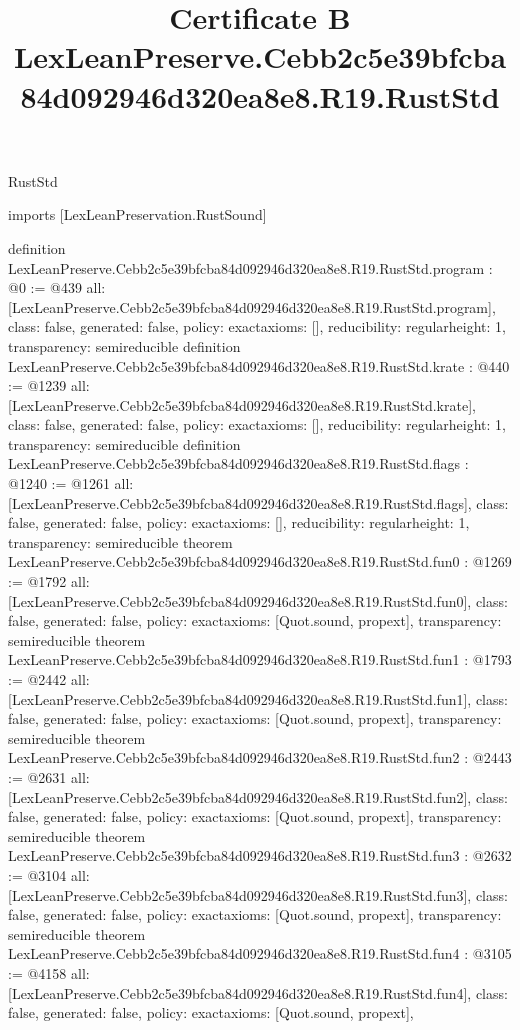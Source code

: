 \begin{lexlean}{RustStd}
\title{Certificate B LexLeanPreserve.Cebb2c5e39bfcba84d092946d320ea8e8.R19.RustStd}
\begin{coremodule}
imports [LexLeanPreservation.RustSound]

definition LexLeanPreserve.Cebb2c5e39bfcba84d092946d320ea8e8.R19.RustStd.program : @0 := @439 {
  all: [LexLeanPreserve.Cebb2c5e39bfcba84d092946d320ea8e8.R19.RustStd.program],
  class: false,
  generated: false,
  policy: exact{axioms: []},
  reducibility: regular{height: 1},
  transparency: semireducible
}
definition LexLeanPreserve.Cebb2c5e39bfcba84d092946d320ea8e8.R19.RustStd.krate : @440 := @1239 {
  all: [LexLeanPreserve.Cebb2c5e39bfcba84d092946d320ea8e8.R19.RustStd.krate],
  class: false,
  generated: false,
  policy: exact{axioms: []},
  reducibility: regular{height: 1},
  transparency: semireducible
}
definition LexLeanPreserve.Cebb2c5e39bfcba84d092946d320ea8e8.R19.RustStd.flags : @1240 := @1261 {
  all: [LexLeanPreserve.Cebb2c5e39bfcba84d092946d320ea8e8.R19.RustStd.flags],
  class: false,
  generated: false,
  policy: exact{axioms: []},
  reducibility: regular{height: 1},
  transparency: semireducible
}
theorem LexLeanPreserve.Cebb2c5e39bfcba84d092946d320ea8e8.R19.RustStd.fun0 : @1269 := @1792 {
  all: [LexLeanPreserve.Cebb2c5e39bfcba84d092946d320ea8e8.R19.RustStd.fun0],
  class: false,
  generated: false,
  policy: exact{axioms: [Quot.sound, propext]},
  transparency: semireducible
}
theorem LexLeanPreserve.Cebb2c5e39bfcba84d092946d320ea8e8.R19.RustStd.fun1 : @1793 := @2442 {
  all: [LexLeanPreserve.Cebb2c5e39bfcba84d092946d320ea8e8.R19.RustStd.fun1],
  class: false,
  generated: false,
  policy: exact{axioms: [Quot.sound, propext]},
  transparency: semireducible
}
theorem LexLeanPreserve.Cebb2c5e39bfcba84d092946d320ea8e8.R19.RustStd.fun2 : @2443 := @2631 {
  all: [LexLeanPreserve.Cebb2c5e39bfcba84d092946d320ea8e8.R19.RustStd.fun2],
  class: false,
  generated: false,
  policy: exact{axioms: [Quot.sound, propext]},
  transparency: semireducible
}
theorem LexLeanPreserve.Cebb2c5e39bfcba84d092946d320ea8e8.R19.RustStd.fun3 : @2632 := @3104 {
  all: [LexLeanPreserve.Cebb2c5e39bfcba84d092946d320ea8e8.R19.RustStd.fun3],
  class: false,
  generated: false,
  policy: exact{axioms: [Quot.sound, propext]},
  transparency: semireducible
}
theorem LexLeanPreserve.Cebb2c5e39bfcba84d092946d320ea8e8.R19.RustStd.fun4 : @3105 := @4158 {
  all: [LexLeanPreserve.Cebb2c5e39bfcba84d092946d320ea8e8.R19.RustStd.fun4],
  class: false,
  generated: false,
  policy: exact{axioms: [Quot.sound, propext]},
}
\end{coremodule}
\end{lexlean}
